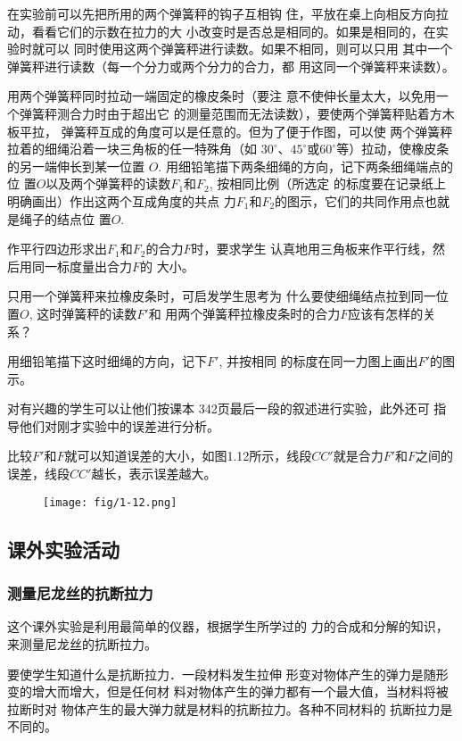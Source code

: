 在实验前可以先把所用的两个弹簧秤的钩子互相钩
住，平放在桌上向相反方向拉动，看看它们的示数在拉力的大
小改变时是否总是相同的。如果是相同的，在实验时就可以
同时使用这两个弹簧秤进行读数。如果不相同，则可以只用
其中一个弹簧秤进行读数（每一个分力或两个分力的合力，都
用这同一个弹簧秤来读数）。

用两个弹簧秤同时拉动一端固定的橡皮条时（要注
意不使伸长量太大，以免用一个弹簧秤测合力时由于超出它
的测量范围而无法读数），要使两个弹簧秤贴着方木板平拉，
弹簧秤互成的角度可以是任意的。但为了便于作图，可以使
两个弹簧秤拉着的细绳沿着一块三角板的任一特殊角（如
$30^{\circ}$、$45^{\circ}$或$60^{\circ}$等）拉动，使橡皮条的另一端伸长到某一位置
$O$. 用细铅笔描下两条细绳的方向，记下两条细绳端点的位
置$O$以及两个弹簧秤的读数$F_1$和$F_2$, 按相同比例（所选定
的标度要在记录纸上明确画出）作出这两个互成角度的共点
力$F_1$和$F_2$的图示，它们的共同作用点也就是绳子的结点位
置$O$.

作平行四边形求出$F_1$和$F_2$的合力$F$时，要求学生
认真地用三角板来作平行线，然后用同一标度量出合力$F$的
大小。

只用一个弹簧秤来拉橡皮条时，可启发学生思考为
什么要使细绳结点拉到同一位置$O$, 这时弹簧秤的读数$F'$和
用两个弹簧秤拉橡皮条时的合力$F$应该有怎样的关系？

用细铅笔描下这时细绳的方向，记下$F'$, 并按相同
的标度在同一力图上画出$F'$的图示。

对有兴趣的学生可以让他们按课本
342页最后一段的叙述进行实验，此外还可
指导他们对刚才实验中的误差进行分析。

比较$F'$和$F$就可以知道误差的大小，如图1.12所示，线段$CC'$就是合力$F'$和$F$之间的误差，线段$CC'$越长，表示误差越大。

\begin{figure}[htp]
    \centering
    \texttt{[image: fig/1-12.png]}
    \caption{}
\end{figure}

\subsection{课外实验活动}
\subsubsection{测量尼龙丝的抗断拉力}
这个课外实验是利用最简单的仪器，根据学生所学过的
力的合成和分解的知识，来测量尼龙丝的抗断拉力。

要使学生知道什么是抗断拉力．一段材料发生拉伸
形变对物体产生的弹力是随形变的增大而增大，但是任何材
料对物体产生的弹力都有一个最大值，当材料将被拉断时对
物体产生的最大弹力就是材料的抗断拉力。各种不同材料的
抗断拉力是不同的。

